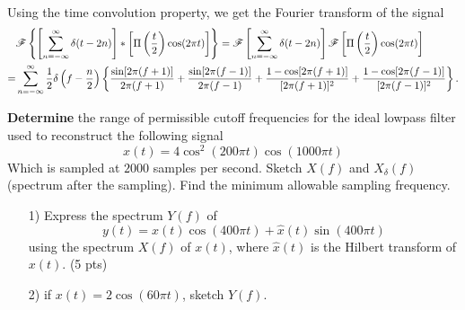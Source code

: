 \documentclass{assignment}
\begin{document}
\begin{sol}
\begin{itemize}
\begin{align}
        \end{align}\normalsize
        Using the time convolution property, we get the Fourier transform of the signal
        \begin{align}
            \notag&\mathscr{F}\left\{\left[\sum_{n=-\infty}^{\infty}\delta(t-2n)\right]*\left[\Pi\left(\frac{t}{2}\right)\cos(2\pi t)\right]\right\}=\mathscr{F}\left[\sum_{n=-\infty}^{\infty}\delta(t-2n)\right]\mathscr{F}\left[\Pi\left(\frac{t}{2}\right)\cos(2\pi t)\right]\\
            =&\sum_{n=-\infty}^{\infty}\frac{1}{2}\delta\left(f-\frac{n}{2}\right)\left\{\frac{\sin[2\pi(f+1)]}{2\pi(f+1)}+\frac{\sin[2\pi(f-1)]}{2\pi(f-1)}+\frac{1-\cos[2\pi(f+1)]}{[2\pi(f+1)]^2}+\frac{1-\cos[2\pi(f-1)]}{[2\pi(f-1)]^2}\right\}.
        \end{align}
    \end{itemize}
\end{sol}

\begin{prob}[15 pts]
    \textbf{Determine} the range of permissible cutoff frequencies for the ideal lowpass filter used to reconstruct the following signal
    \[
        x(t)=4\cos^2(200\pi t)\cos(1000\pi t)
    \]
    Which is sampled at $2000$ samples per second. Sketch $X(f)$ and $X_{\delta}(f)$ (spectrum after the sampling). Find the minimum allowable sampling frequency.
\end{prob}
\begin{sol}

\end{sol}

\begin{prob}
    \begin{itemize}
        \item[1)] Express the spectrum $Y(f)$ of
        \[
            y(t)=x(t)\cos(400\pi t)+\hat{x}(t)\sin(400\pi t)
        \]
        using the spectrum $X(f)$ of $x(t)$, where $\hat{x}(t)$ is the Hilbert transform of $x(t)$. (5 pts)
        \item[2)] if $x(t)=2\cos(60\pi t)$, sketch $Y(f).$
    \end{itemize}
\end{prob}
\begin{sol}

\end{sol}
\end{document}
